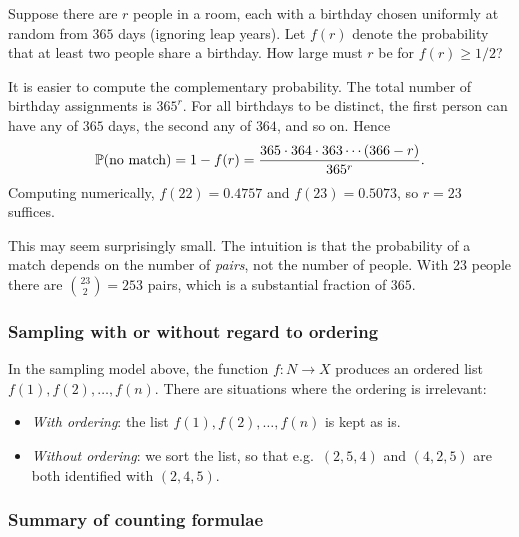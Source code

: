 \documentclass[a4paper]{article}
\begin{document}
\begin{eg}
  Suppose there are $r$ people in a room, each with a birthday chosen uniformly at random from $365$ days (ignoring leap years). Let $f(r)$ denote the probability that at least two people share a birthday. How large must $r$ be for $f(r) \geq 1/2$?

  It is easier to compute the complementary probability. The total number of birthday assignments is $365^r$. For all birthdays to be distinct, the first person can have any of $365$ days, the second any of $364$, and so on. Hence
  \[
    \P(\text{no match}) = 1 - f(r) = \frac{365 \cdot 364 \cdot 363 \cdots (366 - r)}{365^r}.
  \]
  Computing numerically, $f(22) = 0.4757$ and $f(23) = 0.5073$, so $r = 23$ suffices.

  This may seem surprisingly small. The intuition is that the probability of a match depends on the number of \emph{pairs}, not the number of people. With 23 people there are $\binom{23}{2} = 253$ pairs, which is a substantial fraction of $365$.
\end{eg}

\subsubsection*{Sampling with or without regard to ordering}

\begin{remark}
  In the sampling model above, the function $f\colon N \to X$ produces an ordered list $f(1), f(2), \dotsc, f(n)$. There are situations where the ordering is irrelevant:
  \begin{itemize}
    \item \emph{With ordering}: the list $f(1), f(2), \dotsc, f(n)$ is kept as is.
    \item \emph{Without ordering}: we sort the list, so that e.g.\ $(2, 5, 4)$ and $(4, 2, 5)$ are both identified with $(2, 4, 5)$.
  \end{itemize}
\end{remark}

\subsubsection*{Summary of counting formulae}
\end{document}
